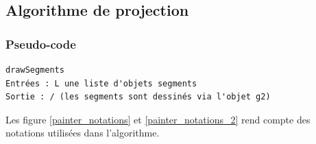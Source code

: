 \documentclass[11pt,a4paper]{article}
\theoremstyle{definition}
\theoremstyle{remark}
\begin{document}
\subsection{Algorithme de projection}

\subsubsection{Pseudo-code}

\begin{lstlisting}
drawSegments
Entrées : L une liste d'objets segments
Sortie : / (les segments sont dessinés via l'objet g2)
\end{lstlisting}

Les figure \ref{painter_notations} et \ref{painter_notations_2} rend compte des notations utilisées dans l'algorithme.
\\
\end{document}
